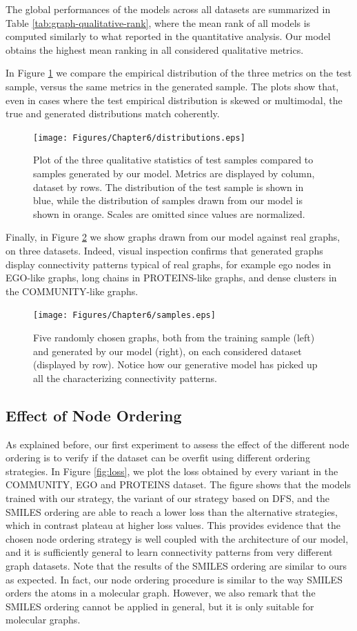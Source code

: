 The global performances of the models across all datasets are summarized in Table \ref{tab:graph-qualitative-rank}, where the mean rank of all models is computed similarly to what reported in the quantitative analysis. Our model obtains the highest mean ranking in all considered qualitative metrics.

In Figure \ref{fig:distributions} we compare the empirical distribution of the three metrics on the test sample, versus the same metrics in the generated sample. The plots show that, even in cases where the test empirical distribution is skewed or multimodal, the true and generated distributions match coherently.
\begin{figure}[h!]
\centering
\texttt{[image: Figures/Chapter6/distributions.eps]}
\caption{Plot of the three qualitative statistics of test samples compared to samples generated by our model. Metrics are displayed by column, dataset by rows. The distribution of the test sample is shown in blue, while the distribution of samples drawn from our model is shown in orange. Scales are omitted since values are normalized.}
\label{fig:distributions}
\end{figure}
Finally, in Figure \ref{fig:samples} we show graphs drawn from our model against real graphs, on three datasets. Indeed, visual inspection confirms that generated graphs display connectivity patterns typical of real graphs, for example ego nodes in EGO-like graphs, long chains in PROTEINS-like graphs, and dense clusters in the COMMUNITY-like graphs.
\begin{figure}[h!]
\centering
\texttt{[image: Figures/Chapter6/samples.eps]}
\caption{Five randomly chosen graphs, both from the training sample (left) and generated by our model (right), on each considered dataset (displayed by row). Notice how our generative model has picked up all the characterizing connectivity patterns.}
\label{fig:samples}
\end{figure}

\subsection{Effect of Node Ordering}
As explained before, our first experiment to assess the effect of the different node ordering is to verify if the dataset can be overfit using different ordering strategies. In Figure \ref{fig:loss}, we plot the loss obtained by every variant in the COMMUNITY, EGO and PROTEINS dataset. The figure shows that the models trained with our strategy, the variant of our strategy based on DFS, and the SMILES ordering are able to reach a lower loss than the alternative strategies, which in contrast plateau at higher loss values. This provides evidence that the chosen node ordering strategy is well coupled with the architecture of our model, and it is sufficiently general to learn connectivity patterns from very different graph datasets. Note that the results of the SMILES ordering are similar to ours as expected. In fact, our node ordering procedure is similar to the way SMILES orders the atoms in a molecular graph. However, we also remark that the SMILES ordering cannot be applied in general, but it is only suitable for molecular graphs.

